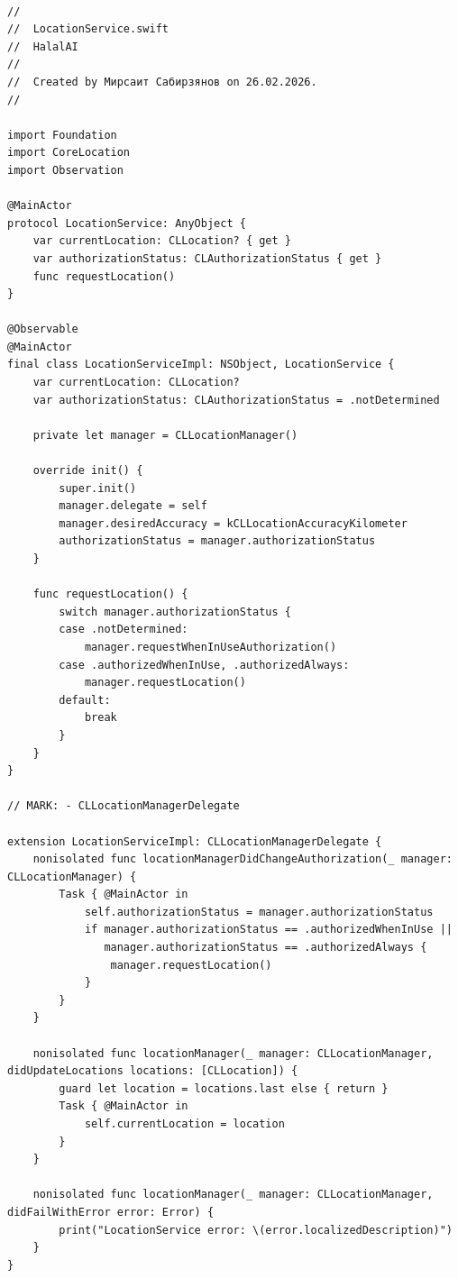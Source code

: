 \begin{lstlisting}[basicstyle=\tiny\ttfamily,breaklines=true]

//
//  LocationService.swift
//  HalalAI
//
//  Created by Мирсаит Сабирзянов on 26.02.2026.
//

import Foundation
import CoreLocation
import Observation

@MainActor
protocol LocationService: AnyObject {
    var currentLocation: CLLocation? { get }
    var authorizationStatus: CLAuthorizationStatus { get }
    func requestLocation()
}

@Observable
@MainActor
final class LocationServiceImpl: NSObject, LocationService {
    var currentLocation: CLLocation?
    var authorizationStatus: CLAuthorizationStatus = .notDetermined

    private let manager = CLLocationManager()

    override init() {
        super.init()
        manager.delegate = self
        manager.desiredAccuracy = kCLLocationAccuracyKilometer
        authorizationStatus = manager.authorizationStatus
    }

    func requestLocation() {
        switch manager.authorizationStatus {
        case .notDetermined:
            manager.requestWhenInUseAuthorization()
        case .authorizedWhenInUse, .authorizedAlways:
            manager.requestLocation()
        default:
            break
        }
    }
}

// MARK: - CLLocationManagerDelegate

extension LocationServiceImpl: CLLocationManagerDelegate {
    nonisolated func locationManagerDidChangeAuthorization(_ manager: CLLocationManager) {
        Task { @MainActor in
            self.authorizationStatus = manager.authorizationStatus
            if manager.authorizationStatus == .authorizedWhenInUse ||
               manager.authorizationStatus == .authorizedAlways {
                manager.requestLocation()
            }
        }
    }

    nonisolated func locationManager(_ manager: CLLocationManager, didUpdateLocations locations: [CLLocation]) {
        guard let location = locations.last else { return }
        Task { @MainActor in
            self.currentLocation = location
        }
    }

    nonisolated func locationManager(_ manager: CLLocationManager, didFailWithError error: Error) {
        print("LocationService error: \(error.localizedDescription)")
    }
}
\end{lstlisting}

